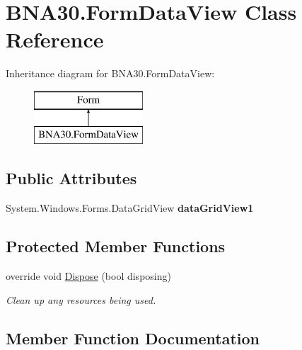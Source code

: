 \hypertarget{class_b_n_a30_1_1_form_data_view}{}\section{B\+N\+A30.\+Form\+Data\+View Class Reference}
\label{class_b_n_a30_1_1_form_data_view}
Inheritance diagram for B\+N\+A30.\+Form\+Data\+View\+:\begin{figure}[H]
\begin{center}
\leavevmode
\includegraphics[height=2.000000cm]{class_b_n_a30_1_1_form_data_view}
\end{center}
\end{figure}
\subsection*{Public Attributes}
\begin{DoxyCompactItemize}
\item 
\mbox{\label{class_b_n_a30_1_1_form_data_view_a590a2695bb688c0602b751751c829f73}} 
System.\+Windows.\+Forms.\+Data\+Grid\+View {\bfseries data\+Grid\+View1}
\end{DoxyCompactItemize}
\subsection*{Protected Member Functions}
\begin{DoxyCompactItemize}
\item 
override void \mbox{\hyperlink{class_b_n_a30_1_1_form_data_view_a7abc531233fe276809c7c183cf383f45}{Dispose}} (bool disposing)
\begin{DoxyCompactList}\small\item\em Clean up any resources being used. \end{DoxyCompactList}\end{DoxyCompactItemize}


\subsection{Member Function Documentation}
\mbox{\label{class_b_n_a30_1_1_form_data_view_a7abc531233fe276809c7c183cf383f45}} 
